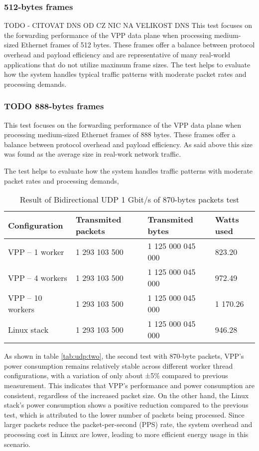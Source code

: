 \subsubsection{512-bytes frames}
TODO - CITOVAT DNS OD CZ NIC NA VELIKOST DNS
This test focuses on the forwarding performance of the VPP data plane when processing medium-sized Ethernet frames of 512 bytes. 
These frames offer a balance between protocol overhead and payload efficiency and are representative of many real-world applications that do not utilize maximum frame sizes. 
The test helps to evaluate how the system handles typical traffic patterns with moderate packet rates and processing demands.

\subsubsection{TODO 888-bytes frames}

This test focuses on the forwarding performance of the VPP data plane when processing medium-sized Ethernet frames of 888 bytes. 
These frames offer a balance between protocol overhead and payload efficiency. As said above this size was found as the average size in real-work network traffic.

The test helps to evaluate how the system handles traffic patterns with moderate packet rates and processing demands, 

\begin{table}[h!]
\centering
\begin{tabular}{|l|l|l|l|}
\hline
\textbf{Configuration} & \textbf{Transmited packets} & \textbf{Transmited bytes} & \textbf{Watts used} \\
\hline
VPP -- 1 worker & 1 293 103 500 & 1 125 000 045 000 & 823.20\\
VPP -- 4 workers & 1 293 103 500 & 1 125 000 045 000 & 972.49\\
VPP -- 10 workers & 1 293 103 500 & 1 125 000 045 000 & 1 170.26\\
Linux stack & 1 293 103 500 & 1 125 000 045 000 & 946.28\\
\hline
\end{tabular}
\caption{Result of Bidirectional UDP 1 Gbit/s of 870-bytes packets test}
\label{tab:udp:three}
\end{table}

As shown in table \ref{tab:udp:two}, the second test with 870-byte packets, 
VPP's power consumption remains relatively stable across different worker thread configurations, with a variation of only about ±5\% compared to previous measurement. 
This indicates that VPP's performance and power consumption are consistent, regardless of the increased packet size. 
On the other hand, the Linux stack's power consumption shows a positive reduction compared to the previous test, which is attributed to the lower number of packets being processed. 
Since larger packets reduce the packet-per-second (PPS) rate, the system overhead and processing cost in Linux are lower, leading to more efficient energy usage in this scenario.

